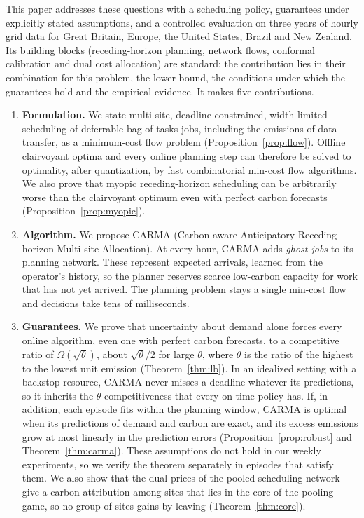 This paper addresses these questions with a scheduling policy, guarantees under explicitly stated assumptions, and a controlled evaluation on three years of hourly grid data for Great Britain, Europe, the United States, Brazil and New Zealand. Its building blocks (receding-horizon planning, network flows, conformal calibration and dual cost allocation) are standard; the contribution lies in their combination for this problem, the lower bound, the conditions under which the guarantees hold and the empirical evidence. It makes five contributions.
\begin{enumerate}
\item \textbf{Formulation.} We state multi-site, deadline-constrained, width-limited scheduling of deferrable bag-of-tasks jobs, including the emissions of data transfer, as a minimum-cost flow problem (Proposition~\ref{prop:flow}). Offline clairvoyant optima and every online planning step can therefore be solved to optimality, after quantization, by fast combinatorial min-cost flow algorithms. We also prove that myopic receding-horizon scheduling can be arbitrarily worse than the clairvoyant optimum even with perfect carbon forecasts (Proposition~\ref{prop:myopic}).
\item \textbf{Algorithm.} We propose CARMA (Carbon-aware Anticipatory Receding-horizon Multi-site Allocation). At every hour, CARMA adds \emph{ghost jobs} to its planning network. These represent expected arrivals, learned from the operator's history, so the planner reserves scarce low-carbon capacity for work that has not yet arrived. The planning problem stays a single min-cost flow and decisions take tens of milliseconds.
\item \textbf{Guarantees.} We prove that uncertainty about demand alone forces every online algorithm, even one with perfect carbon forecasts, to a competitive ratio of $\Omega(\sqrt{\theta})$, about $\sqrt{\theta}/2$ for large $\theta$, where $\theta$ is the ratio of the highest to the lowest unit emission (Theorem~\ref{thm:lb}). In an idealized setting with a backstop resource, CARMA never misses a deadline whatever its predictions, so it inherits the $\theta$-competitiveness that every on-time policy has. If, in addition, each episode fits within the planning window, CARMA is optimal when its predictions of demand and carbon are exact, and its excess emissions grow at most linearly in the prediction errors (Proposition~\ref{prop:robust} and Theorem~\ref{thm:carma}). These assumptions do not hold in our weekly experiments, so we verify the theorem separately in episodes that satisfy them. We also show that the dual prices of the pooled scheduling network give a carbon attribution among sites that lies in the core of the pooling game, so no group of sites gains by leaving (Theorem~\ref{thm:core}).

\end{enumerate}
